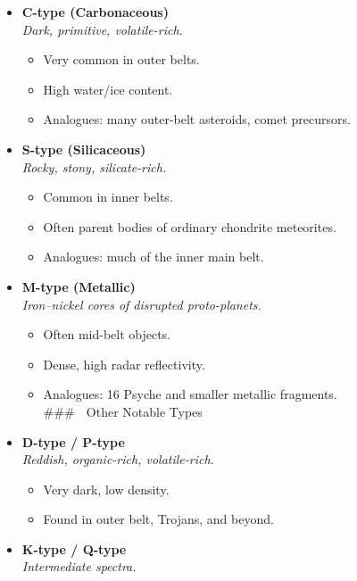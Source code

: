 \documentclass[
  letterpaper,
]{book}
\providecommand{\tightlist}{%
  \setlength{\itemsep}{0pt}\setlength{\parskip}{0pt}}
\begin{document}
\begin{itemize}
\tightlist
\item
  \textbf{C-type (Carbonaceous)}\\
  \emph{Dark, primitive, volatile-rich.}

  \begin{itemize}
  \tightlist
  \item
    Very common in outer belts.\\
  \item
    High water/ice content.\\
  \item
    Analogues: many outer-belt asteroids, comet precursors.
  \end{itemize}
\item
  \textbf{S-type (Silicaceous)}\\
  \emph{Rocky, stony, silicate-rich.}

  \begin{itemize}
  \tightlist
  \item
    Common in inner belts.\\
  \item
    Often parent bodies of ordinary chondrite meteorites.\\
  \item
    Analogues: much of the inner main belt.
  \end{itemize}
\item
  \textbf{M-type (Metallic)}\\
  \emph{Iron--nickel cores of disrupted proto-planets.}

  \begin{itemize}
  \tightlist
  \item
    Often mid-belt objects.\\
  \item
    Dense, high radar reflectivity.\\
  \item
    Analogues: 16 Psyche and smaller metallic fragments.\\
    \#\#\# 🔹 Other Notable Types
  \end{itemize}
\item
  \textbf{D-type / P-type}\\
  \emph{Reddish, organic-rich, volatile-rich.}

  \begin{itemize}
  \tightlist
  \item
    Very dark, low density.\\
  \item
    Found in outer belt, Trojans, and beyond.
  \end{itemize}
\item
  \textbf{K-type / Q-type}\\
  \emph{Intermediate spectra.}


\end{itemize}
\end{document}
